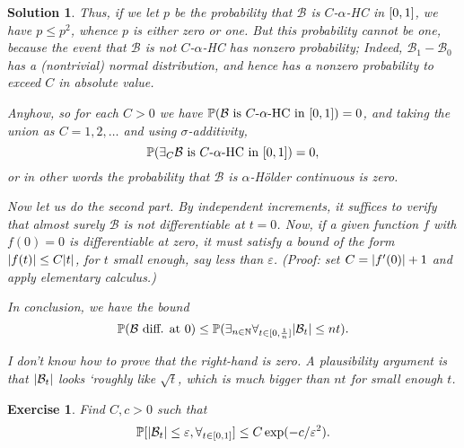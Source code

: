 \documentclass{article}
\newtheorem{ex}{Exercise}
\theoremstyle{nonumberplain}
\newtheorem{sol}{Solution}
\newcommand{\N}{\mathbb{N}}
\DeclarePairedDelimiter{\abs}{\lvert}{\rvert}
\newcommand{\PP}{\mathbb{P}}
\newcommand{\Brwn}{\mathcal{B}}
\begin{document}
\begin{sol}
Thus, if we let $p$ be the probability that $\Brwn$ is $C$-$\alpha$-HC in $\interval01$, we have $p \leq p^2$, whence $p$ is either zero or one. But this probability cannot be one, because the event that $\Brwn$ is not $C$-$\alpha$-HC has nonzero probability; Indeed, $\Brwn_1 - \Brwn_0$ has a (nontrivial) normal distribution, and hence has a nonzero probability to exceed $C$ in absolute value.

Anyhow, so for each $C > 0$ we have $\PP(\text{$\Brwn$ is $C$-$\alpha$-HC in $\interval01$}) = 0$, and taking the union as $C = 1, 2, \dots$ and using $\sigma$-additivity,
\begin{equation}
\PP(\exists_C \text{$\Brwn$ is $C$-$\alpha$-HC in $\interval01$}) = 0,
\end{equation}
or in other words the probability that $\Brwn$ is $\alpha$-Hölder continuous is zero.

\medskip

Now let us do the second part. By independent increments, it suffices to verify that almost surely $\Brwn$ is not differentiable at $t = 0$. Now, if a given function $f$ with $f(0) = 0$ is differentiable at zero, it must satisfy a bound of the form $\abs{f(t)} \leq C \abs t$, for $t$ small enough, say less than $\varepsilon$. (Proof: set $C = \abs{f'(0)} + 1$ and apply elementary calculus.)

In conclusion, we have the bound
\begin{equation}
\PP(\text{$\Brwn$ diff. at $0$}) \leq \PP(\exists_{n \in \N} \forall_{t \in \interval0{\frac1n}} \abs{\Brwn_t} \leq n  t).
\end{equation}

I don't know how to prove that the right-hand is zero. A plausibility argument is that $\abs{\Brwn_t}$ looks `roughly like $\sqrt t$, which is much bigger than $n t$ for small enough $t$.
\end{sol}

\begin{ex}
Find $C,c > 0$ such that
\begin{equation}
\PP[\abs{\Brwn_t} \leq \varepsilon, \forall_{t \in \interval01}] \leq C \exp(-c/\varepsilon^2).
\end{equation}
\end{ex}
\end{document}
